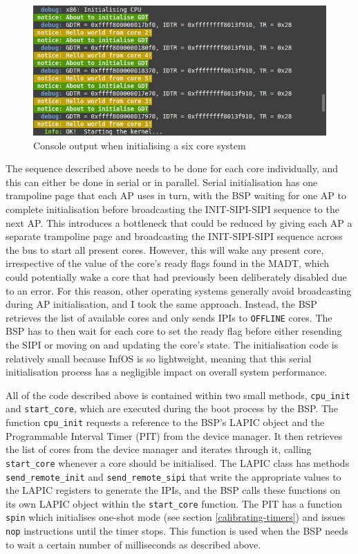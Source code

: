 \documentclass[bsc,frontabs,singlespacing,parskip,deptreport]{infthesis}
\begin{document}
\begin{figure}[h]
    \centering
    \includegraphics[scale=0.6]{figures/hello-world.jpg}
    \caption{Console output when initialising a six core system}
    \label{hello-world}
\end{figure}

The sequence described above needs to be done for each core individually, and this can either be done in serial or in parallel. Serial initialisation has one trampoline page that each AP uses in turn, with the BSP waiting for one AP to complete initialisation before broadcasting the INIT-SIPI-SIPI sequence to the next AP. This introduces a bottleneck that could be reduced by giving each AP a separate trampoline page and broadcasting the INIT-SIPI-SIPI sequence across the bus to start all present cores. However, this will wake any present core, irrespective of the value of the core's ready flags found in the MADT, which could potentially wake a core that had previously been deliberately disabled due to an error. For this reason, other operating systems generally avoid broadcasting during AP initialisation, and I took the same approach. Instead, the BSP retrieves the list of available cores and only sends IPIs to \verb|OFFLINE| cores. The BSP has to then wait for each core to set the ready flag before either resending the SIPI or moving on and updating the core's state. The initialisation code is relatively small because InfOS is so lightweight, meaning that this serial initialisation process has a negligible impact on overall system performance. 

All of the code described above is contained within two small methods, \verb|cpu_init| and \verb|start_core|, which are executed during the boot process by the BSP. The function \verb|cpu_init| requests a reference to the BSP's LAPIC object and the Programmable Interval Timer (PIT) from the device manager. It then retrieves the list of cores from the device manager and iterates through it, calling \verb|start_core| whenever a core should be initialised. The LAPIC class has methods \verb|send_remote_init| and \verb|send_remote_sipi| that write the appropriate values to the LAPIC registers to generate the IPIs, and the BSP calls these functions on its own LAPIC object within the \verb|start_core| function. The PIT has a function \verb|spin| which initialises one-shot mode (see section \ref{calibrating-timers}) and issues \verb|nop| instructions until the timer stops. This function is used when the BSP needs to wait a certain number of milliseconds as described above.
\end{document}
